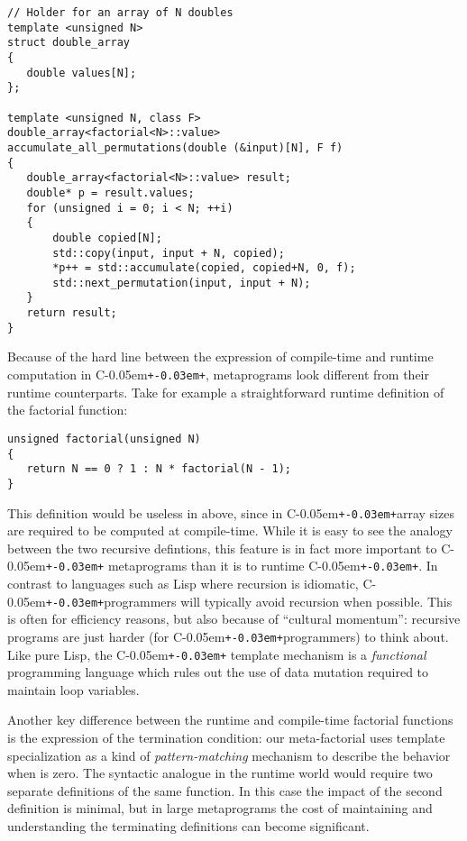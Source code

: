 \documentclass{netobjectdays}
\newcommand{\Cpp}{C\kern-0.05em\texttt{+\kern-0.03em+}}
\begin{document}
{\footnotesize
\begin{verbatim}
// Holder for an array of N doubles
template <unsigned N>
struct double_array
{
   double values[N];
};

template <unsigned N, class F>
double_array<factorial<N>::value>
accumulate_all_permutations(double (&input)[N], F f)
{
   double_array<factorial<N>::value> result;
   double* p = result.values;
   for (unsigned i = 0; i < N; ++i)
   {
       double copied[N];
       std::copy(input, input + N, copied);
       *p++ = std::accumulate(copied, copied+N, 0, f);
       std::next_permutation(input, input + N);
   }
   return result;
}
\end{verbatim}
}

Because of the hard line between the expression of compile-time and
runtime computation in \Cpp, metaprograms look different from their
runtime counterparts. Take for example a straightforward runtime
definition of the factorial function:

{\footnotesize
\begin{verbatim}
unsigned factorial(unsigned N)
{
   return N == 0 ? 1 : N * factorial(N - 1);
}
\end{verbatim}
}

This definition would be useless in 
above, since in \Cpp array sizes are required to be computed at
compile-time. While it is easy to see the analogy between the two
recursive defintions, this feature is in fact more important to \Cpp
metaprograms than it is to runtime \Cpp. In contrast to languages such
as Lisp where recursion is idiomatic, \Cpp programmers will typically
avoid recursion when possible. This is often for efficiency reasons,
but also because of ``cultural momentum'': recursive programs are just
harder (for \Cpp programmers) to think about. Like pure Lisp, the \Cpp
template mechanism is a \emph{functional} programming language which
rules out the use of data mutation required to maintain loop
variables.

Another key difference between the runtime and compile-time factorial
functions is the expression of the termination condition: our
meta-factorial uses template specialization as a kind of
\emph{pattern-matching} mechanism to describe the behavior when
 is zero. The syntactic analogue in the runtime world would
require two separate definitions of the same function. In this case
the impact of the second definition is minimal, but in large
metaprograms the cost of maintaining and understanding the terminating
definitions can become significant.
\end{document}
